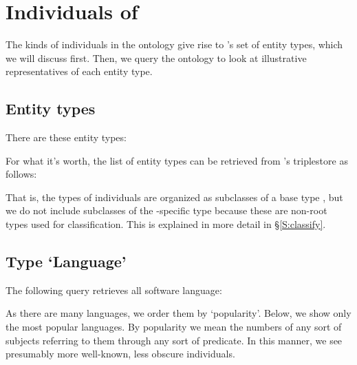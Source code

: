 
\section{Individuals of \solasote}
\label{S:entities}

The kinds of individuals in the ontology give rise to \solasote's set
of entity types, which we will discuss first. Then, we query the
ontology to look at illustrative representatives of each entity type.


\subsection{Entity types}

There are these entity types:


\noindent
For what it's worth, the list of entity types can be retrieved from
\solasote's triplestore as follows:


\noindent
That is, the types of individuals are organized as subclasses of a
base type , but we do not include subclasses of the
\solasote-specific type  because these are
non-root types used for classification. This is explained in more
detail in \S\ref{S:classify}.


\subsection{Type `Language'}

The following query retrieves all software language:


\noindent
As there are many languages, we order them by `popularity'. Below, we
show only the most popular languages. By popularity we mean the
numbers of any sort of subjects referring to them through any sort of
predicate. In this manner, we see presumably more well-known, less
obscure individuals.



